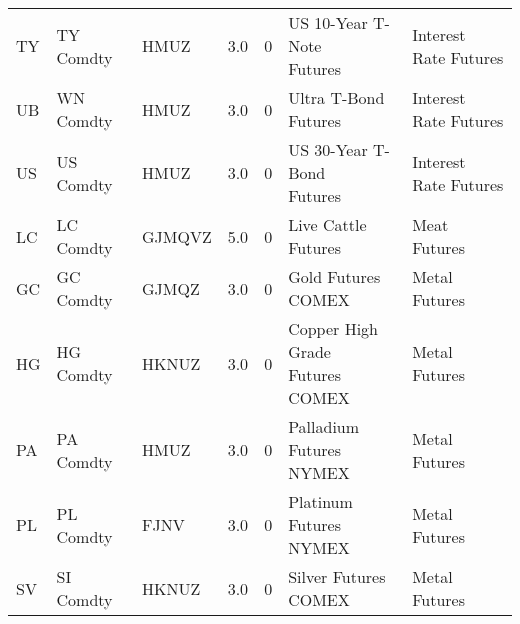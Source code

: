 \begin{longtable}{lllrrll}
                   TY &              TY Comdty &                      HMUZ &                               3.0 &                        0 &                      \makecell{US 10-Year T-Note\\Futures} &   Interest Rate Futures \\
                   UB &              WN Comdty &                      HMUZ &                               3.0 &                        0 &                                       Ultra T-Bond Futures &   Interest Rate Futures \\
                   US &              US Comdty &                      HMUZ &                               3.0 &                        0 &                      \makecell{US 30-Year T-Bond\\Futures} &   Interest Rate Futures \\
                   LC &              LC Comdty &       \makecell{GJMQVZ\\} &                               5.0 &                        0 &                                        Live Cattle Futures &            Meat Futures \\
                   GC &              GC Comdty &                     GJMQZ &                               3.0 &                        0 &                                         Gold Futures COMEX &           Metal Futures \\
                   HG &              HG Comdty &                     HKNUZ &                               3.0 &                        0 &                \makecell{Copper High Grade\\Futures COMEX} &           Metal Futures \\
                   PA &              PA Comdty &                      HMUZ &                               3.0 &                        0 &                        \makecell{Palladium Futures\\NYMEX} &           Metal Futures \\
                   PL &              PL Comdty &                      FJNV &                               3.0 &                        0 &                         \makecell{Platinum Futures\\NYMEX} &           Metal Futures \\
                   SV &              SI Comdty &                     HKNUZ &                               3.0 &                        0 &                                       Silver Futures COMEX &           Metal Futures \\
\end{longtable}
